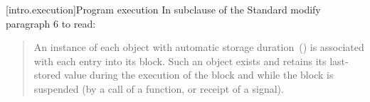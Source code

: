 %

[intro.execution]{Program execution}
In subclause  of the \Cpp Standard modify paragraph 6 to read:
\begin{quote}
\setcounter{Paras}{6}
\pnum 
An instance of each object with automatic storage 
duration~() is associated with each entry into its 
block. Such an object exists and retains its last-stored value during 
the execution of the block and while the block is suspended (by a call 
of a function, 
or receipt of a signal). 
\end{quote}

%





%
%	

